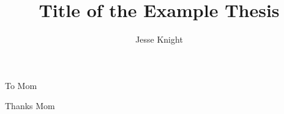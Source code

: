 \documentclass{ut-thesis}
\author{Jesse Knight}
\title{Title of the Example Thesis}
\begin{document}
  \frontmatter
    \maketitle
    \begin{abstract}
      
    \end{abstract}
    \begin{dedication}
      To Mom
    \end{dedication}
    \begin{acknowledgements}
      Thanks Mom
    \end{acknowledgements}
    \tableofcontents
    \listoftables
    \listoffigures
  \mainmatter
    
    
    
  \appendix
    
  \backmatter
  \printbibliography[heading=bibintoc]
  \lipsum[1-6]
\end{document}
